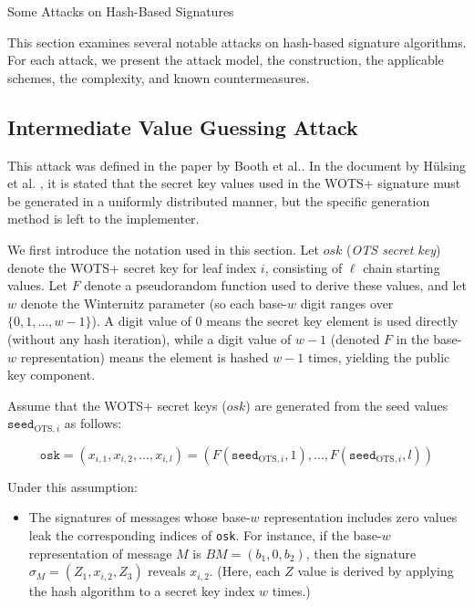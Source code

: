 \documentclass[version=preprint]{iacrcc}
\begin{document}
\begin{section}{Some Attacks on Hash-Based Signatures}

This section examines several notable attacks on hash-based signature algorithms. For each attack, we present the attack model, the construction, the applicable schemes, the complexity, and known countermeasures.

\subsection{Intermediate Value Guessing Attack}

This attack was defined in the paper by Booth et al.\cite{booth2021intermediate}. In the document by H\"ulsing et al. \cite{huelsing2018rfc}, it is stated that the secret key values used in the WOTS+ signature must be generated in a uniformly distributed manner, but the specific generation method is left to the implementer.

We first introduce the notation used in this section. Let $\mathit{osk}$ (\textit{OTS secret key}) denote the WOTS+ secret key for leaf index $i$, consisting of $\ell$ chain starting values. Let $F$ denote a pseudorandom function used to derive these values, and let $w$ denote the Winternitz parameter (so each base-$w$ digit ranges over $\{0, 1, \ldots, w{-}1\}$). A digit value of $0$ means the secret key element is used directly (without any hash iteration), while a digit value of $w{-}1$ (denoted $F$ in the base-$w$ representation) means the element is hashed $w{-}1$ times, yielding the public key component.

Assume that the WOTS+ secret keys ($\mathit{osk}$) are generated from the seed values $\texttt{seed}_{\text{OTS},i}$ as follows:

\[
\texttt{osk} = (x_{i,1}, x_{i,2}, \ldots, x_{i,l}) = (F(\texttt{seed}_{\text{OTS},i},1), \ldots, F(\texttt{seed}_{\text{OTS},i},l))
\]

Under this assumption:

\begin{itemize}
    \item The signatures of messages whose base-$w$ representation includes zero values leak the corresponding indices of \texttt{osk}. For instance, if the base-$w$ representation of message $M$ is $BM = (b_1, 0, b_2)$, then the signature $\sigma_M = (Z_1, x_{i,2}, Z_3)$ reveals $x_{i,2}$. (Here, each $Z$ value is derived by applying the hash algorithm to a secret key index $w$ times.)
    

\end{itemize}
\end{section}
\end{document}
